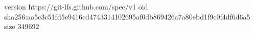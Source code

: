 version https://git-lfs.github.com/spec/v1
oid sha256:aa5c3c51fd5e9416cd4743314102695af0db869426a7a80ebd1f9c0f4df6d6a5
size 349692
